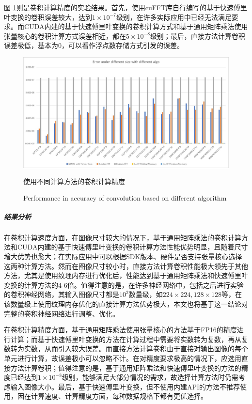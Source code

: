 \par 图 \ref{Fig.CONVPr}则是卷积计算精度的实验结果。首先，使用cuFFT库自行编写的基于快速傅里叶变换的卷积误差较大，达到$ 1\times 10^{-7} $级别，在许多实际应用中已经无法满足要求。而CUDA内建的基于快速傅里叶变换的卷积计算方式和基于通用矩阵乘法使用张量核心的卷积计算方式误差相近，都在$ 5\times 10^{-8} $级别；最后，直接方法计算卷积误差极低，基本为0，可以看作浮点数存储方式引发的误差。
\begin{figure}
	\centering
	\includegraphics[width=15cm]{figures/CONVError.jpg}
	\renewcommand{\thefigure}{\arabic{section}-\arabic{figure} }
	\renewcommand{\figurename}{图}
	\caption{使用不同计算方法的卷积计算精度}
	\addtocounter{figure}{-1}
	\renewcommand{\thefigure}{\arabic{section}-\arabic{figure} }
	\renewcommand{\figurename}{Figure}
	\caption{Performance in accuracy of convolution based on different algorithm}
	\label{Fig.CONVPr}
\end{figure}
\subparagraph{结果分析}
\par 在卷积计算速度方面，在图像尺寸较大的情况下，基于通用矩阵乘法的卷积计算方法和CUDA内建的基于快速傅里叶变换的卷积计算方法性能优势明显，且随着尺寸增大优势也愈大；在实际应用中可以根据SDK版本、硬件是否支持张量核心选择这两种计算方法。然而在图像尺寸较小时，直接方法计算卷积性能极大领先于其他方法，尤其是使用纹理内存进行优化后，性能达到基于通用矩阵乘法和快速傅里叶变换的计算方法的4-6倍。值得注意的是，在许多神经网络中，包括之后进行实验的卷积神经网络，其输入图像尺寸都是$ 10^2 $数量级，如$ 224\times 224, 128\times 128 $等，在该数量级上使用纹理内存优化的直接计算方法优势极大，本文也将基于这一结论对完整的卷积神经网络进行调整、优化。
\par 在卷积计算精度方面，基于通用矩阵乘法使用张量核心的方法基于FP16的精度进行计算；而基于快速傅里叶变换的方法在计算过程中需要将实数转为复数，再从复数转为实数，从而引入较大误差。而直接方法计算卷积由于直接对输出图像的每个单元进行计算，故误差极小可以忽略不计。在对精度要求极高的情况下，应选用直接方法计算卷积；值得注意的是，基于通用矩阵乘法和快速傅里叶变换的方法的精度已经达到$ 1\times 10^{-8} $级别，能够满足大部分情况的需求，故选择计算方法时仍需考虑输入图像大小。最后，基于快速傅里叶变换，但不使用内建API的方法不推荐使用，因在计算速度、计算精度方面，每种数据规格下都有更优选择。
